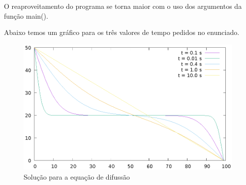   O reaproveitamento do programa se torna maior com o uso dos argumentos da função main().

  Abaixo temos um gráfico para os três valores de tempo pedidos no enunciado.

  \begin{figure}[h]
    \includegraphics[scale = 1.0]{q4.eps}
    \caption{Solução para a equação de difussão}
  \end{figure}


